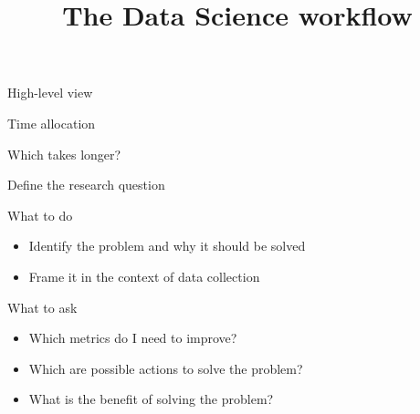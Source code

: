 

\title{The Data Science workflow}



\maketitle

\begin{frame}{High\hyp{}level view}
\end{frame}

\begin{frame}{Time allocation}
    \begin{center}
        \LARGE%
        Which takes longer?
    \end{center}
\end{frame}

\begin{frame}[t]{Define the research question}
    \begin{block}{What to do}
        \begin{itemize}
            \item Identify the problem and why it should be solved
            \item Frame it in the context of data collection
        \end{itemize}
    \end{block}
    \vfill
    \begin{block}{What to ask}
        \begin{itemize}
            \item Which metrics do I need to improve?
            \item Which are possible actions to solve the problem?
            \item What is the benefit of solving the problem?
        \end{itemize}
    \end{block}
\end{frame}

